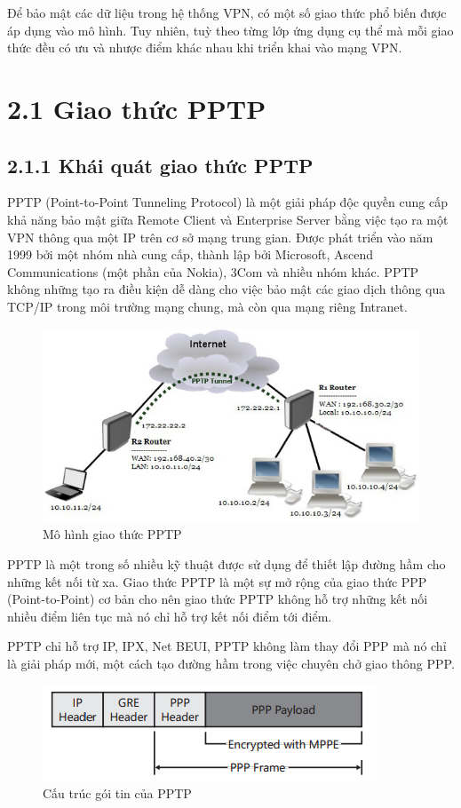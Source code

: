 
 Để bảo mật các dữ liệu trong hệ thống VPN, có một số giao thức phổ biến được áp dụng vào mô hình. Tuy nhiên, tuỳ theo từng lớp ứng dụng cụ thể mà mỗi giao thức đều có ưu và nhược điểm khác nhau khi triển khai vào mạng VPN.
    
 \section*{2.1 Giao thức PPTP}
 \subsection*{2.1.1 Khái quát giao thức PPTP}

 PPTP (Point-to-Point Tunneling Protocol) là một giải pháp độc quyền cung cấp khả năng bảo mật giữa Remote Client và Enterprise Server bằng việc tạo ra một VPN thông qua một IP trên cơ sở mạng trung gian. Được phát triển vào năm 1999 bởi một nhóm nhà cung cấp, thành lập bởi Microsoft, Ascend Communications (một phần của Nokia), 3Com và nhiều nhóm khác. PPTP không những tạo ra điều kiện dễ dàng cho việc bảo mật các giao dịch thông qua TCP/IP trong môi trường mạng chung, mà còn qua mạng riêng Intranet. 

 
 \begin{figure}[htbp]
    \centering
    \includegraphics[width=0.7\linewidth]{img/pptp.png}
    \caption{Mô hình giao thức PPTP}
 \end{figure}
PPTP là một trong số nhiều kỹ thuật được sử dụng để thiết lập đường hầm cho những kết nối từ xa. Giao thức PPTP là một sự mở rộng của giao thức PPP (Point-to-Point) cơ bản cho nên giao thức PPTP không hỗ trợ những kết nối nhiều điểm liên tục mà nó chỉ hỗ trợ kết nối điểm tới điểm.

PPTP chỉ hỗ trợ IP, IPX, Net BEUI, PPTP không làm thay đổi PPP mà nó chỉ là giải pháp mới, một cách tạo đường hầm trong việc chuyên chở giao thông PPP.
    \begin{figure}[htbp]
        \centering
        \includegraphics[width=0.7\linewidth]{img/packetPPTP.png}
        \caption{Cấu trúc gói tin của PPTP}
    \end{figure}
